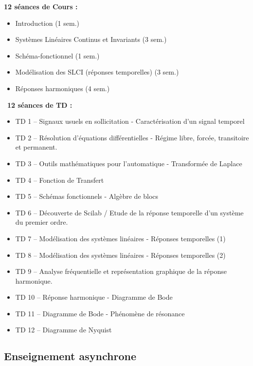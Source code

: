 \documentclass[a4paper,11pt]{article}
\begin{document}
\noindent \textbf{12 séances de Cours :}
\begin{itemize}
    \item Introduction                                   \hfill (1 sem.)
    \item Systèmes Linéaires Continus et Invariants      \hfill (3 sem.)
    \item Schéma-fonctionnel                             \hfill (1 sem.)
    \item Modélisation des SLCI (réponses temporelles)   \hfill (3 sem.)
    \item Réponses harmoniques                           \hfill (4 sem.)
\end{itemize}
$\,$\newline
\noindent \textbf{12 séances de TD :}
\begin{itemize}
    \item TD 1  -- Signaux usuels en sollicitation - Caractérisation d'un signal temporel
    \item TD 2  -- Résolution d'équations différentielles - Régime libre, forcée, transitoire et permanent.
    \item TD 3  -- Outils mathématiques pour l'automatique - Transformée de Laplace
    \item TD 4  -- Fonction de Transfert
    \item TD 5  -- Schémas fonctionnels - Algèbre de blocs
    \item TD 6  -- Découverte de Scilab / Etude de la réponse temporelle d'un système du premier ordre.    
    \item TD 7  -- Modélisation des systèmes linéaires - Réponses temporelles (1)
    \item TD 8  -- Modélisation des systèmes linéaires - Réponses temporelles (2)
    \item TD 9  -- Analyse fréquentielle et représentation graphique de la réponse harmonique.
    \item TD 10 -- Réponse harmonique - Diagramme de Bode
    \item TD 11 -- Diagramme de Bode - Phénomène de résonance
    \item TD 12 -- Diagramme de Nyquist
\end{itemize}

\subsection*{Enseignement asynchrone}
\end{document}
